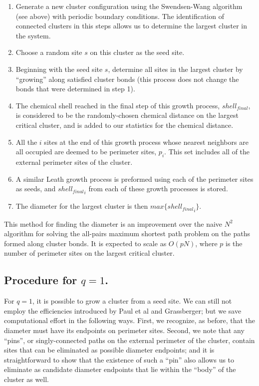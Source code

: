 \documentclass[pre,preprint,11pt]{revtex4}
\begin{document}
\begin {enumerate}
\item Generate a new cluster configuration using the Swendsen-Wang algorithm (see above) with periodic boundary conditions. The identification of connected clusters in this steps allows us to determine the largest cluster in the system.
\item Choose a random site $s$ on this cluster as the seed site.
\item Beginning with the seed site $s$, determine all sites in the largest cluster by ``growing'' along satisfied cluster bonds (this process does not change the bonds that were determined in step 1).
\item The chemical shell reached in the final step of this growth process, $shell_{final}$, is considered to be the randomly-chosen chemical distance on the largest critical cluster, and is added to our statistics for the chemical distance.  
\item All the $i$ sites at the end of this growth process whose nearest neighbors are all occupied are deemed to be perimeter sites, $p_i$.  This set includes all of the external perimeter sites of the cluster.
\item A similar Leath growth process is preformed using each of the perimeter sites as seeds, and ${shell_{final}}_i$ from each of these growth processes is stored.
\item The diameter for the largest cluster is then $max\{{shell_{final}}_i\}$.
\end {enumerate}

This method for finding the diameter is an improvement over the naive $N^2$ algorithm for solving the all-pairs maximum shortest path problem on the paths formed along cluster bonds. It is expected to scale as $O(pN)$, where $p$ is the number of perimeter sites on the largest critical cluster.



\subsection{ Procedure for $q=1$.} 

For $q=1$, it is possible to grow a cluster from a seed site.  We can still not employ the efficiencies introduced by Paul et al and Grassberger; but we save computational effort in the following ways.  First, we recognize, as before, that the diameter must have its endpoints on perimeter sites. Second, we note that any ``pins'', or singly-connected paths on the external perimeter of the cluster, contain sites that can be eliminated as possible diameter endpoints; and it is straightforward to show that the existence of such a ``pin'' also allows us to eliminate as candidate diameter endpoints that lie within the ``body'' of the cluster as well.  
\end{document}
